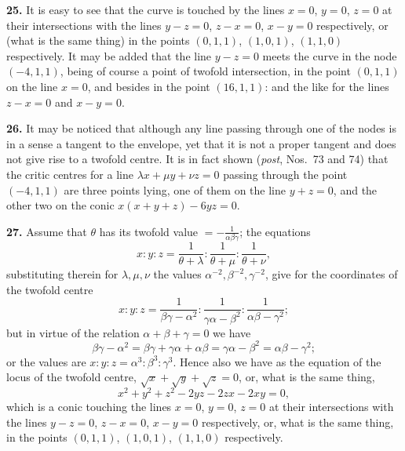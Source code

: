 \documentclass[11pt,a4paper]{article}
\begin{document}
\medskip

\textbf{25.} It is easy to see that the curve is touched by the lines $x = 0$, $y = 0$, $z = 0$ at their intersections with the lines $y - z = 0$, $z - x = 0$, $x - y = 0$ respectively, or (what is the same thing) in the points $(0, 1, 1)$, $(1, 0, 1)$, $(1, 1, 0)$ respectively. It may be added that the line $y - z = 0$ meets the curve in the node $(-4, 1, 1)$, being of course a point of twofold intersection, in the point $(0, 1, 1)$ on the line $x = 0$, and besides in the point $(16, 1, 1)$: and the like for the lines $z - x = 0$ and $x - y = 0$.

\medskip

\textbf{26.} It may be noticed that although any line passing through one of the nodes is in a sense a tangent to the envelope, yet that it is not a proper tangent and does not give rise to a twofold centre. It is in fact shown (\textit{post}, Nos.~73 and 74) that the critic centres for a line $\lambda x + \mu y + \nu z = 0$ passing through the point $(-4, 1, 1)$ are three points lying, one of them on the line $y + z = 0$, and the other two on the conic $x(x + y + z) - 6yz = 0$.

\medskip

\textbf{27.} Assume that $\theta$ has its twofold value $= -\tfrac{1}{\alpha\beta\gamma}$; the equations
\[
x : y : z = \frac{1}{\theta + \lambda} : \frac{1}{\theta + \mu} : \frac{1}{\theta + \nu},
\]
substituting therein for $\lambda, \mu, \nu$ the values $\alpha^{-2}, \beta^{-2}, \gamma^{-2}$, give for the coordinates of the twofold centre
\[
x : y : z = \frac{1}{\beta\gamma - \alpha^2} : \frac{1}{\gamma\alpha - \beta^2} : \frac{1}{\alpha\beta - \gamma^2};
\]
but in virtue of the relation $\alpha + \beta + \gamma = 0$ we have
\[
\beta\gamma - \alpha^2 = \beta\gamma + \gamma\alpha + \alpha\beta = \gamma\alpha - \beta^2 = \alpha\beta - \gamma^2;
\]
or the values are $x : y : z = \alpha^3 : \beta^3 : \gamma^3$. Hence also we have as the equation of the locus of the twofold centre, $\sqrt{x} + \sqrt{y} + \sqrt{z} = 0$, or, what is the same thing,
\[
x^2 + y^2 + z^2 - 2yz - 2zx - 2xy = 0,
\]
which is a conic touching the lines $x = 0$, $y = 0$, $z = 0$ at their intersections with the lines $y - z = 0$, $z - x = 0$, $x - y = 0$ respectively, or, what is the same thing, in the points $(0, 1, 1)$, $(1, 0, 1)$, $(1, 1, 0)$ respectively.

\medskip
\end{document}
